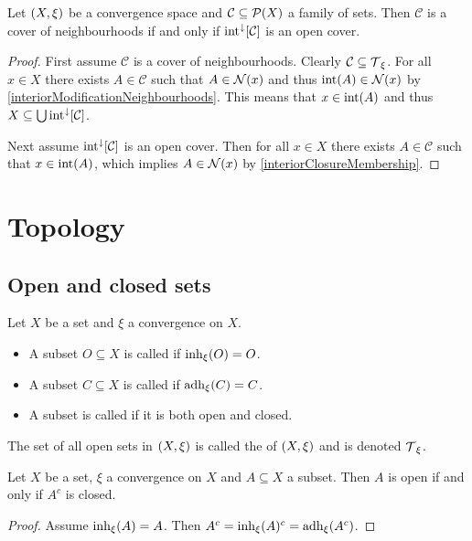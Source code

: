 \begin{lemma}
Let $\sSet{X,\xi}$ be a convergence space and $\mathcal{C}\subseteq \operatorname{\mathcal{P}}(X)$ a family of sets. Then $\mathcal{C}$ is a cover of neighbourhoods \textup{if and only if} $\operatorname{int}^\downarrow[\mathcal{C}]$ is an open cover.
\end{lemma}
\begin{proof}
First assume $\mathcal{C}$ is a cover of neighbourhoods. Clearly $\mathcal{C} \subseteq \operatorname{\mathcal{T}}_\xi$. For all $x\in X$ there exists $A\in \mathcal{C}$ such that $A\in \operatorname{\mathcal{N}}(x)$ and thus $\operatorname{int}(A) \in \operatorname{\mathcal{N}}(x)$ by \ref{interiorModificationNeighbourhoods}. This means that $x\in \operatorname{int}(A)$ and thus $X\subseteq \bigcup\operatorname{int}^\downarrow[\mathcal{C}]$.

Next assume $\operatorname{int}^\downarrow[\mathcal{C}]$ is an open cover. Then for all $x\in X$ there exists $A\in \mathcal{C}$ such that $x\in \operatorname{int}(A)$, which implies $A\in \operatorname{\mathcal{N}}(x)$ by \ref{interiorClosureMembership}.
\end{proof}




\section{Topology}
\subsection{Open and closed sets}
\begin{definition}
Let $X$ be a set and $\xi$ a convergence on $X$.
\begin{itemize}
    \item A subset $O \subseteq X$ is called  if $\operatorname{inh}_\xi(O) = O$.
    \item A subset $C \subseteq X$ is called  if $\operatorname{adh}_\xi(C) = C$.
    \item A subset is called  if it is both open and closed.
\end{itemize}
The set of all open sets in $\sSet{X,\xi}$ is called the  of $\sSet{X,\xi}$ and is denoted $\operatorname{\mathcal{T}}_\xi$.
\end{definition}

\begin{lemma} \label{openClosedComplement}
Let $X$ be a set, $\xi$ a convergence on $X$ and $A\subseteq X$ a subset. Then $A$ is open \textup{if and only if} $A^c$ is closed.
\end{lemma}
\begin{proof}
Assume $\operatorname{inh}_\xi(A) = A$. Then $A^c = \operatorname{inh}_\xi(A)^c = \operatorname{adh}_\xi(A^c)$.
\end{proof}

